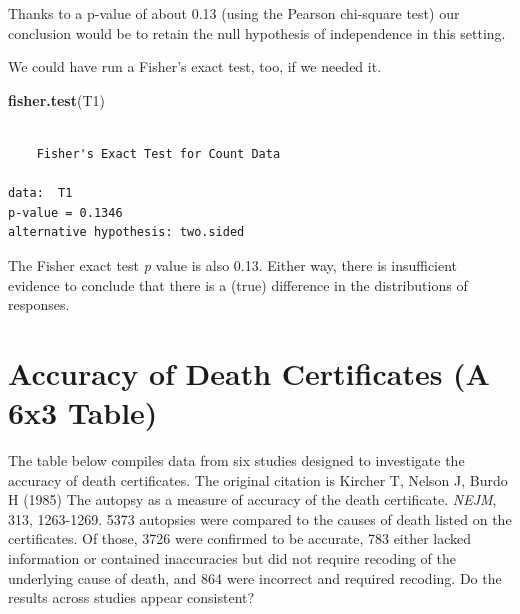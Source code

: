 \documentclass[
]{book}
\newenvironment{Shaded}{\begin{snugshade}}{\end{snugshade}}
\newcommand{\KeywordTok}[1]{\textcolor[rgb]{0.13,0.29,0.53}{\textbf{#1}}}
\newcommand{\NormalTok}[1]{#1}
\begin{document}
Thanks to a p-value of about 0.13 (using the Pearson chi-square test) our conclusion would be to retain the null hypothesis of independence in this setting.

We could have run a Fisher's exact test, too, if we needed it.

\begin{Shaded}
\begin{Highlighting}[]
\KeywordTok{fisher.test}\NormalTok{(T1)}
\end{Highlighting}
\end{Shaded}

\begin{verbatim}

	Fisher's Exact Test for Count Data

data:  T1
p-value = 0.1346
alternative hypothesis: two.sided
\end{verbatim}

The Fisher exact test \emph{p} value is also 0.13. Either way, there is insufficient evidence to conclude that there is a (true) difference in the distributions of responses.

\hypertarget{accuracy-of-death-certificates-a-6x3-table}{%
\section{Accuracy of Death Certificates (A 6x3 Table)}\label{accuracy-of-death-certificates-a-6x3-table}}

The table below compiles data from six studies designed to investigate the accuracy of death certificates. The original citation is Kircher T, Nelson J, Burdo H (1985) The autopsy as a measure of accuracy of the death certificate. \emph{NEJM}, 313, 1263-1269. 5373 autopsies were compared to the causes of death listed on the certificates. Of those, 3726 were confirmed to be accurate, 783 either lacked information or contained inaccuracies but did not require recoding of the underlying cause of death, and 864 were incorrect and required recoding. Do the results across studies appear consistent?
\end{document}
